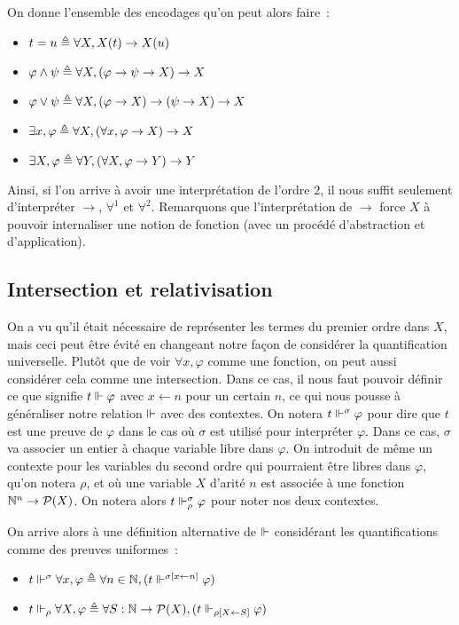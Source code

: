 \documentclass{article}
\begin{document}
On donne l'ensemble des encodages qu'on peut alors faire~:
\begin{itemize}
\item $t = u \triangleq \forall X, X(t) \to X(u)$
\item $\varphi\land \psi \triangleq \forall X, (\varphi \to \psi \to X) \to X$
\item $\varphi \lor \psi \triangleq \forall X, (\varphi \to X) \to (\psi \to X) \to X$
\item $\exists x, \varphi \triangleq \forall X, (\forall x, \varphi \to X) \to X$
\item $\exists X, \varphi \triangleq \forall Y, (\forall X, \varphi \to Y) \to Y$
\end{itemize}

Ainsi, si l'on arrive à avoir une interprétation de l'ordre $2$, il nous suffit seulement d'interpréter $\to$, $\forall^1$ et $\forall^2$. Remarquons que l'interprétation de $\to$ force $X$ à pouvoir internaliser une notion de fonction (avec un procédé d'abstraction et d'application).

\subsection{Intersection et relativisation}

On a vu qu'il était nécessaire de représenter les termes du premier ordre dans $X$, mais ceci peut être évité en changeant notre façon de considérer la quantification universelle. Plutôt que de voir $\forall x, \varphi$ comme une fonction, on peut aussi considérer cela comme une intersection. Dans ce cas, il nous faut pouvoir définir ce que signifie $t\Vdash\varphi$ avec $x\leftarrow n$ pour un certain $n$, ce qui nous pousse à généraliser notre relation $\Vdash$ avec des contextes. On notera $t\Vdash^\sigma \varphi$ pour dire que $t$ est une preuve de $\varphi$ dans le cas où $\sigma$ est utilisé pour interpréter $\varphi$. Dans ce cas, $\sigma$ va associer un entier à chaque variable libre dans $\varphi$. On introduit de même un contexte pour les variables du second ordre qui pourraient être libres dans $\varphi$, qu'on notera $\rho$, et où une variable $X$ d'arité $n$ est associée à une fonction $\mathbb{N}^n \to \mathcal P(X)$. On notera alors $t\Vdash_\rho^\sigma \varphi$ pour noter nos deux contextes.

On arrive alors à une définition alternative de $\Vdash$ considérant les quantifications comme des preuves uniformes~:
\begin{itemize}
\item $t\Vdash^\sigma \forall x,\varphi \triangleq \forall n \in \mathbb{N}, (t\Vdash^{\sigma[x \leftarrow n]} \varphi)$
\item $t\Vdash_\rho \forall X, \varphi \triangleq \forall S : \mathbb{N} \to \mathcal P(X), (t\Vdash_{\rho[X\leftarrow S]}\varphi)$
\end{itemize}
\end{document}
